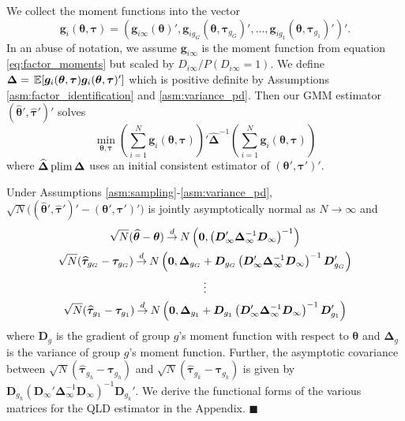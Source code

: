 We collect the moment functions into the vector 
$$
\bm g_i(\bm{\theta}, \bm \tau) = (\bm g_{i\infty}(\bm{\theta})', \bm g_{ig_G}(\bm{\theta}, \bm \tau_{g_G})',...,\bm g_{ig_1}(\bm{\theta}, \bm \tau_{g_1})')'.
$$ 
In an abuse of notation, we assume $\bm g_{i\infty}$ is the moment function from equation \eqref{eq:factor_moments} but scaled by $D_{i\infty} / P(D_{i \infty} = 1)$. We define $\bm \Delta = \expec{\bm g_i(\bm{\theta}, \bm \tau) \bm g_i(\bm{\theta}, \bm \tau)'}$ which is positive definite by Assumptions \ref{asm:factor_identification} and \ref{asm:variance_pd}. Then our GMM estimator $(\widehat{ \bm{\theta}}', \widehat{ \bm \tau}')'$ solves
\begin{equation}\label{eq:minimization_problem}
  \min_{\bm{\theta}, \bm \tau} \left( \sum_{i = 1}^N \bm g_i(\bm{\theta}, \bm \tau) \right)' \widehat{\bm \Delta}^{-1} \left( \sum_{i = 1}^N \bm g_i(\bm{\theta}, \bm \tau) \right)
\end{equation}
where $\widehat{\bm \Delta} \operatorname{plim} \bm \Delta$ uses an initial consistent estimator of $(\bm{\theta}', \bm \tau')'$. 

\begin{theorem}\label{theorem:asymptotic_distribution}
  Under Assumptions \ref{asm:sampling}-\ref{asm:variance_pd}, $\sqrt{N}\big((\widehat{\bm{\theta}}', \widehat{\bm \tau}')' - (\bm{\theta}', \bm \tau')'\big)$ is jointly asymptotically normal as $N \rightarrow \infty$ and
  \begin{gather*}
    \sqrt{N}(\widehat{\bm{\theta}} - \bm{\theta}) \mathbin{\overset{d}{\to}} N \left( \bm 0, \left( \bm D'_{\infty} \bm \Delta_{\infty}^{-1} \bm D_{\infty} \right)^{-1} \right) \\
    \sqrt{N}(\widehat{\bm \tau}_{g_G} - \bm \tau_{g_G}) \mathbin{\overset{d}{\to}} N \left( \bm 0, \bm \Delta_{g_G} + \bm D_{g_G} \left( \bm D'_{\infty} \bm \Delta_{\infty}^{-1} \bm D_{\infty} \right)^{-1} \bm D_{g_G}'  \right)\\
    \vdots\\
    \sqrt{N}(\widehat{\bm \tau}_{g_1} - \bm \tau_{g_1}) \mathbin{\overset{d}{\to}} N \left( \bm 0, \bm \Delta_{g_1} + \bm D_{g_1} \left( \bm D'_{\infty} \bm \Delta_{\infty}^{-1} \bm D_{\infty} \right)^{-1} \bm D_{g_1}' \right)
  \end{gather*}
where $\bm D_g$ is the gradient of group $g$'s moment function with respect to $\bm{\theta}$ and $\bm \Delta_g$ is the variance of group $g$'s moment function. Further, the asymptotic covariance between $\sqrt{N}(\widehat{\bm \tau}_{g_h} - \bm \tau_{g_h})$ and $\sqrt{N}(\widehat{\bm \tau}_{g_k} - \bm \tau_{g_k})$ is given by $\bm D_{g_h} (\bm D_{\infty}' \bm \Delta_{\infty}^{-1} \bm D_{\infty})^{-1} \bm D_{g_k}'$. We derive the functional forms of the various matrices for the QLD estimator in the Appendix. $\blacksquare$
\end{theorem}

